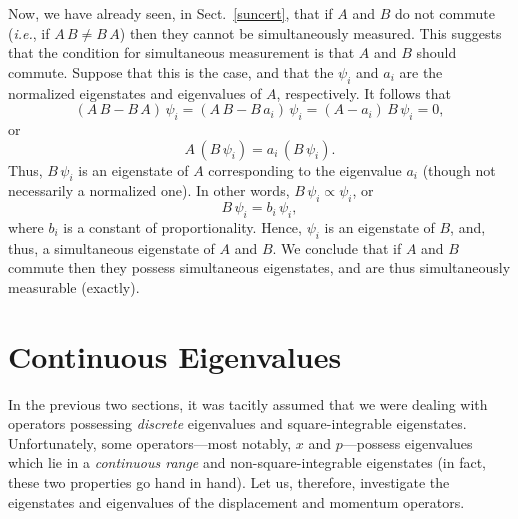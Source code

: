 Now, we have already seen, in Sect.~\ref{suncert}, that if $A$ and $B$
do not commute ({\em i.e.}, if $A\,B\neq B\,A$) then they cannot
be simultaneously measured. This suggests that the condition
for simultaneous measurement is that $A$ and $B$ should commute.
 Suppose that this is the case, and  that the $\psi_i$ and $a_i$ are the normalized eigenstates and
eigenvalues of $A$, respectively. It follows that
\begin{equation}
(A\,B-B\,A)\,\psi_i = (A\,B-B\,a_i)\,\psi_i = (A-a_i)\,B\,\psi_i = 0,
\end{equation}
or
\begin{equation}
A\,(B\,\psi_i) = a_i\,(B\,\psi_i).
\end{equation}
Thus, $B\,\psi_i$ is an eigenstate of $A$ corresponding to
the eigenvalue $a_i$ (though not necessarily a normalized one). In other words, $B\,\psi_i\propto \psi_i$, or
\begin{equation}
B\,\psi_i = b_i\,\psi_i,
\end{equation}
where $b_i$ is a constant of proportionality.
Hence, $\psi_i$  is an eigenstate of $B$, and, thus,  a simultaneous
eigenstate of $A$ and $B$. We conclude that if $A$ and $B$ commute then
they possess simultaneous eigenstates, and are thus simultaneously measurable (exactly). 

\section{Continuous Eigenvalues}
In the previous two sections, it was tacitly assumed that we were dealing
with operators possessing {\em discrete}\/ eigenvalues and square-integrable
eigenstates. Unfortunately, some operators---most notably,  $x$ and 
$p$---possess
eigenvalues which lie in a {\em continuous range}  and non-square-integrable
eigenstates (in fact, these two properties go hand in hand). Let us, therefore, investigate
the eigenstates and eigenvalues of the displacement and momentum
operators.

